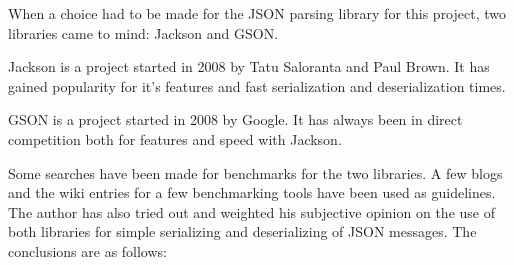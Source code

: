 
When a choice had to be made for the JSON parsing library for this project, two
libraries came to mind: Jackson and GSON.\newline

Jackson is a project started in 2008 by Tatu Saloranta and Paul Brown. It has
gained popularity for it's features and fast serialization and deserialization
times.\newline

GSON is a project started in 2008 by Google. It has always been in direct
competition both for features and speed with Jackson.\newline

Some searches have been made for benchmarks for the two libraries. A few
blogs\cite{jacksonvsgson} \cite{jacksonvsgson2} \cite{jacksonvsgson4} and the
wiki entries for a few benchmarking tools\cite{jacksonvsgson3} \cite{jacksonvsgson5}
have been used as guidelines. The author has also tried out and weighted his
subjective opinion on the use of both libraries for simple serializing and
deserializing of JSON messages. The conclusions are as follows:
